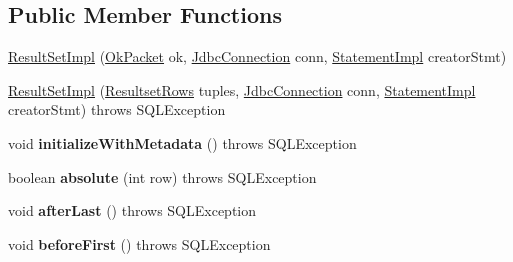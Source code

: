 \subsection*{Public Member Functions}
\begin{DoxyCompactItemize}
\item 
\mbox{\hyperlink{classcom_1_1mysql_1_1cj_1_1jdbc_1_1result_1_1_result_set_impl_a914a5dc6a7f92d9cb726895992aaeb0e}{Result\+Set\+Impl}} (\mbox{\hyperlink{classcom_1_1mysql_1_1cj_1_1protocol_1_1a_1_1result_1_1_ok_packet}{Ok\+Packet}} ok, \mbox{\hyperlink{interfacecom_1_1mysql_1_1cj_1_1jdbc_1_1_jdbc_connection}{Jdbc\+Connection}} conn, \mbox{\hyperlink{classcom_1_1mysql_1_1cj_1_1jdbc_1_1_statement_impl}{Statement\+Impl}} creator\+Stmt)
\item 
\mbox{\hyperlink{classcom_1_1mysql_1_1cj_1_1jdbc_1_1result_1_1_result_set_impl_a2ebfe75dbf98c582aa529c0c65aa4ccb}{Result\+Set\+Impl}} (\mbox{\hyperlink{interfacecom_1_1mysql_1_1cj_1_1protocol_1_1_resultset_rows}{Resultset\+Rows}} tuples, \mbox{\hyperlink{interfacecom_1_1mysql_1_1cj_1_1jdbc_1_1_jdbc_connection}{Jdbc\+Connection}} conn, \mbox{\hyperlink{classcom_1_1mysql_1_1cj_1_1jdbc_1_1_statement_impl}{Statement\+Impl}} creator\+Stmt)  throws S\+Q\+L\+Exception 
\item 
\mbox{\label{classcom_1_1mysql_1_1cj_1_1jdbc_1_1result_1_1_result_set_impl_a83a383615c0e63986857084dd29750b0}} 
void {\bfseries initialize\+With\+Metadata} ()  throws S\+Q\+L\+Exception 
\item 
\mbox{\label{classcom_1_1mysql_1_1cj_1_1jdbc_1_1result_1_1_result_set_impl_acf33f2f745961fc69369edcfd4a80db2}} 
boolean {\bfseries absolute} (int row)  throws S\+Q\+L\+Exception 
\item 
\mbox{\label{classcom_1_1mysql_1_1cj_1_1jdbc_1_1result_1_1_result_set_impl_ae9eb2ace7cbdf8884d9efec6e7d85bc1}} 
void {\bfseries after\+Last} ()  throws S\+Q\+L\+Exception 
\item 
\mbox{\label{classcom_1_1mysql_1_1cj_1_1jdbc_1_1result_1_1_result_set_impl_a5d96f0944fa2ba630ab798a7ea305931}} 
void {\bfseries before\+First} ()  throws S\+Q\+L\+Exception 
\item 

\end{DoxyCompactItemize}
